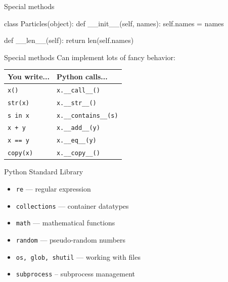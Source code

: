 \documentclass[noamssymb,svgnames]{beamer}
\newcommand{\obj}[1]{\texttt{\color{darkblue}#1}}
\begin{document}
\begin{frame}[fragile]{Special methods}
  \begin{python}
      class Particles(object):
          def __init__(self, names):
              self.names = names

          def __len__(self):
              return len(self.names)
  \end{python}
\end{frame}

\begin{frame}{Special methods}
  Can implement lots of fancy behavior:
  \begin{table}
    \centering
    \begin{tabular}{ll}
      \toprule
      You write... & Python calls... \\
      \midrule
      \obj{x()} & \obj{x.\_\_call\_\_()} \\
      \obj{str(x)} & \obj{x.\_\_str\_\_()} \\
      \obj{s in x} & \obj{x.\_\_contains\_\_(s)} \\
      \obj{x + y} & \obj{x.\_\_add\_\_(y)} \\
      \obj{x == y} & \obj{x.\_\_eq\_\_(y)} \\
      \obj{copy(x)} & \obj{x.\_\_copy\_\_()} \\
      \bottomrule
    \end{tabular}
  \end{table}
\end{frame}

\begin{frame}{Python Standard Library}
  \begin{itemize}
  \item \obj{re} --- regular expression
  \item \obj{collections} --- container datatypes
  \item \obj{math} --- mathematical functions
  \item \obj{random} --- pseudo-random numbers
  \item \obj{os, glob, shutil} --- working with files
  \item \obj{subprocess} -- subprocess management
  \end{itemize}
\end{frame}
\end{document}

